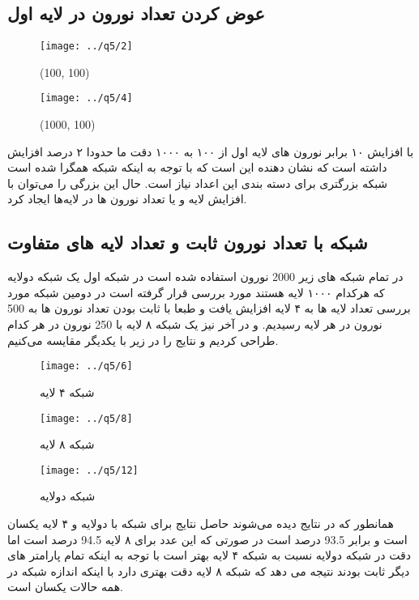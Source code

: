 \documentclass[a4paper,12pt]{article}
\begin{document}
\newpage
\subsection{ عوض کردن تعداد نورون در لایه اول }

\begin{figure}[!htb]
  \texttt{[image: ../q5/2]}
  \caption{ (100, 100) }
\endminipage\hfill
{}
  \texttt{[image: ../q5/4]}
  \caption{(1000, 100) }
\endminipage\hfill
\end{figure}

با افزایش ۱۰ برابر نورون های لایه اول از ۱۰۰ به ۱۰۰۰ دقت ما حدودا ۲ درصد افزایش داشته است که نشان دهنده این است که با توجه به اینکه شبکه همگرا شده است شبکه بزرگتری برای دسته بندی این اعداد نیاز است. حال این بزرگی را می‌توان با افزایش لایه و یا تعداد نورون ها در لایه‌ها ایجاد کرد.

\subsection{ شبکه با تعداد نورون ثابت و تعداد لایه های متفاوت }
در تمام شبکه های زیر 2000 نورون استفاده شده است در شبکه اول یک شبکه دولایه که هرکدام ۱۰۰۰ لایه هستند مورد بررسی قرار گرفته است در دومین شبکه مورد بررسی تعداد لایه ها به ۴ لایه افزایش یافت و طبعا با ثابت بودن تعداد نورون ها به 500 نورون در هر لایه رسیدیم. و در آخر نیز یک شبکه ۸ لایه با 250 نورون در هر کدام طراحی کردیم و نتایج را در زیر با یکدیگر مقایسه می‌کنیم.

\begin{figure}[!htb]
  \texttt{[image: ../q5/6]}
  \caption{ شبکه ۴ لایه }
\endminipage\hfill
{}
  \texttt{[image: ../q5/8]}
  \caption{ شبکه ۸ لایه }
\endminipage\hfill
\end{figure}

\begin{figure}[!htb]
  \texttt{[image: ../q5/12]}
  \caption{ شبکه دولایه }
\endminipage\hfill
\end{figure}

همانطور که در نتایج دیده می‌شوند حاصل نتایج برای شبکه با دولایه و ۴ لایه یکسان است و برابر 93.5 درصد است در صورتی که این عدد برای ۸ لایه 94.5 درصد است اما دقت در شبکه دولایه نسبت به شبکه ۴ لایه بهتر است با توجه به اینکه تمام پارامتر های دیگر ثابت بودند نتیجه می دهد که شبکه ۸ لایه دقت بهتری دارد با اینکه اندازه شبکه در همه حالات یکسان است.
\newpage
\end{document}
